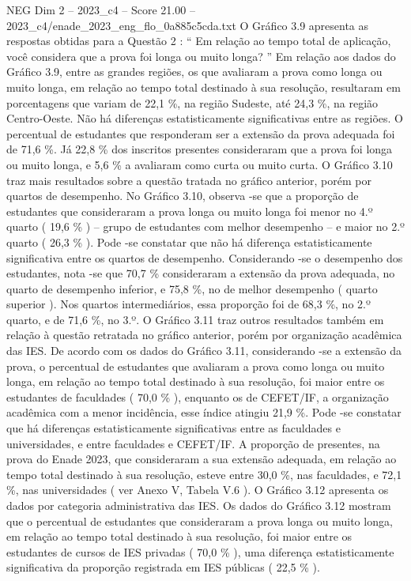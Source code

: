 \begin{textsample}{NEG Dim 2 – 2023\_c4 – Score 21.00 – 2023\_c4/enade\_2023\_eng\_flo\_0a885c5cda.txt}
O Gráfico 3.9 apresenta as respostas obtidas para a Questão 2 : “ Em relação ao tempo total de aplicação, você considera que a prova foi longa ou muito longa? ” Em relação aos dados do Gráfico 3.9, entre as grandes regiões, os que avaliaram a prova como longa ou muito longa, em relação ao tempo total destinado à sua resolução, resultaram em porcentagens que variam de 22,1 \%, na região Sudeste, até 24,3 \%, na região Centro-Oeste.
Não há diferenças estatisticamente significativas entre as regiões.
O percentual de estudantes que responderam ser a extensão da prova adequada foi de 71,6 \%.
Já 22,8 \% dos inscritos presentes consideraram que a prova foi longa ou muito longa, e 5,6 \% a avaliaram como curta ou muito curta.
O Gráfico 3.10 traz mais resultados sobre a questão tratada no gráfico anterior, porém por quartos de desempenho.
No Gráfico 3.10, observa -se que a proporção de estudantes que consideraram a prova longa ou muito longa foi menor no 4.º quarto ( 19,6 \% ) – grupo de estudantes com melhor desempenho – e maior no 2.º quarto ( 26,3 \% ).
Pode -se constatar que não há diferença estatisticamente significativa entre os quartos de desempenho.
Considerando -se o desempenho dos estudantes, nota -se que 70,7 \% consideraram a extensão da prova adequada, no quarto de desempenho inferior, e 75,8 \%, no de melhor desempenho ( quarto superior ).
Nos quartos intermediários, essa proporção foi de 68,3 \%, no 2.º quarto, e de 71,6 \%, no 3.º.
O Gráfico 3.11 traz outros resultados também em relação à questão retratada no gráfico anterior, porém por organização acadêmica das IES.
De acordo com os dados do Gráfico 3.11, considerando -se a extensão da prova, o percentual de estudantes que avaliaram a prova como longa ou muito longa, em relação ao tempo total destinado à sua resolução, foi maior entre os estudantes de faculdades ( 70,0 \% ), enquanto os de CEFET/IF, a organização acadêmica com a menor incidência, esse índice atingiu 21,9 \%.
Pode -se constatar que há diferenças estatisticamente significativas entre as faculdades e universidades, e entre faculdades e CEFET/IF.
A proporção de presentes, na prova do Enade 2023, que consideraram a sua extensão adequada, em relação ao tempo total destinado à sua resolução, esteve entre 30,0 \%, nas faculdades, e 72,1 \%, nas universidades ( ver Anexo V, Tabela V.6 ).
O Gráfico 3.12 apresenta os dados por categoria administrativa das IES.
Os dados do Gráfico 3.12 mostram que o percentual de estudantes que consideraram a prova longa ou muito longa, em relação ao tempo total destinado à sua resolução, foi maior entre os estudantes de cursos de IES privadas ( 70,0 \% ), uma diferença estatisticamente significativa da proporção registrada em IES públicas ( 22,5 \% ).

\end{textsample}
